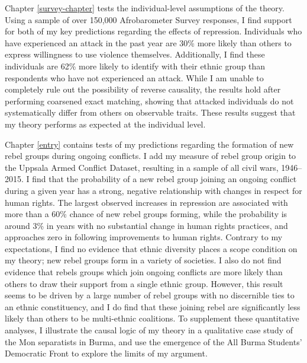 \documentclass[12pt,]{book}
\theoremstyle{definition}
\theoremstyle{definition}
\theoremstyle{remark}
\begin{document}
Chapter \ref{survey-chapter} tests the individual-level assumptions of
the theory. Using a sample of over 150,000 Afrobarometer Survey
responses, I find support for both of my key predictions regarding the
effects of repression. Individuals who have experienced an attack in the
past year are 30\% more likely than others to express willingness to use
violence themselves. Additionally, I find these individuals are 62\%
more likely to identify with their ethnic group than respondents who
have not experienced an attack. While I am unable to completely rule out
the possibility of reverse causality, the results hold after performing
coarsened exact matching, showing that attacked individuals do not
systematically differ from others on observable traits. These results
suggest that my theory performs as expected at the individual level.

Chapter \ref{entry} contains tests of my predictions regarding the
formation of new rebel groups during ongoing conflicts. I add my measure
of rebel group origin to the Uppsala Armed Conflict Dataset, resulting
in a sample of all civil wars, 1946--2015. I find that the probability
of a new rebel group joining an ongoing conflict during a given year has
a strong, negative relationship with changes in respect for human
rights. The largest observed increases in repression are associated with
more than a 60\% chance of new rebel groups forming, while the
probability is around 3\% in years with no substantial change in human
rights practices, and approaches zero in following improvements to human
rights. Contrary to my expectations, I find no evidence that ethnic
diversity places a scope condition on my theory; new rebel groups form
in a variety of societies. I also do not find evidence that rebels
groups which join ongoing conflicts are more likely than others to draw
their support from a single ethnic group. However, this result seems to
be driven by a large number of rebel groups with no discernible ties to
an ethnic constituency, and I do find that these joining rebel are
significantly less likely than others to be multi-ethnic coalitions. To
supplement these quantitative analyses, I illustrate the causal logic of
my theory in a qualitative case study of the Mon separatists in Burma,
and use the emergence of the All Burma Students' Democratic Front to
explore the limits of my argument.
\end{document}
